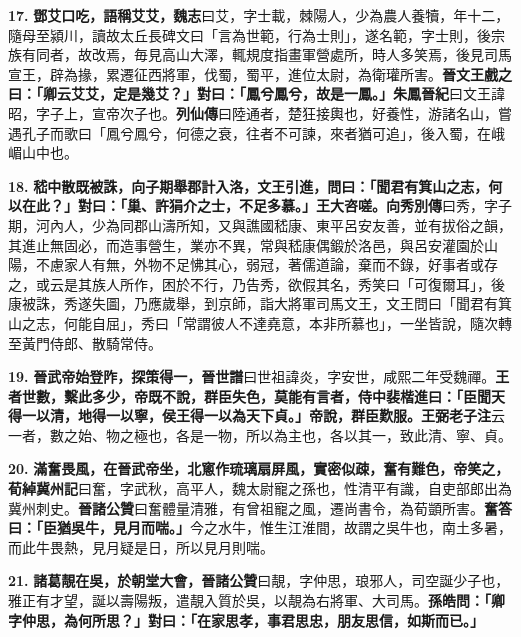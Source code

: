\textbf{17.} \textbf{鄧艾口吃，語稱艾艾，}{\footnotesize \textbf{魏志}曰艾，字士載，棘陽人，少為農人養犢，年十二，隨母至潁川，讀故太丘長碑文曰「言為世範，行為士則」，遂名範，字士則，後宗族有同者，故改焉，毎見高山大澤，輒規度指畫軍營處所，時人多笑焉，後見司馬宣王，辟為掾，累遷征西將軍，伐蜀，蜀平，進位太尉，為衛瓘所害。}\textbf{晉文王戲之曰：「卿云艾艾，定是幾艾？」對曰：「鳳兮鳳兮，故是一鳳。」}{\footnotesize \textbf{朱鳳晉紀}曰文王諱昭，字子上，宣帝次子也。\textbf{列仙傳}曰陸通者，楚狂接輿也，好養性，游諸名山，嘗遇孔子而歌曰「鳳兮鳳兮，何德之衰，往者不可諫，來者猶可追」，後入蜀，在峨嵋山中也。}

\textbf{18.} \textbf{嵇中散既被誅，向子期舉郡計入洛，文王引進，問曰：「聞君有箕山之志，何以在此？」對曰：「巢、許狷介之士，不足多慕。」王大咨嗟。}{\footnotesize \textbf{向秀別傳}曰秀，字子期，河內人，少為同郡山濤所知，又與譙國嵇康、東平呂安友善，並有拔俗之韻，其進止無固必，而造事營生，業亦不異，常與嵇康偶鍛於洛邑，與呂安灌園於山陽，不慮家人有無，外物不足怫其心，弱冠，著儒道論，棄而不錄，好事者或存之，或云是其族人所作，困於不行，乃告秀，欲假其名，秀笑曰「可復爾耳」，後康被誅，秀遂失圖，乃應歲舉，到京師，詣大將軍司馬文王，文王問曰「聞君有箕山之志，何能自屈」，秀曰「常謂彼人不達堯意，本非所慕也」，一坐皆說，隨次轉至黃門侍郎、散騎常侍。}

\textbf{19.} \textbf{晉武帝始登阼，探策得一，}{\footnotesize \textbf{晉世譜}曰世祖諱炎，字安世，咸熙二年受魏禪。}\textbf{王者世數，繫此多少，帝既不說，群臣失色，莫能有言者，侍中裴楷進曰：「臣聞天得一以清，地得一以寧，侯王得一以為天下貞。」帝說，群臣歎服。}{\footnotesize \textbf{王弼老子注}云一者，數之始、物之極也，各是一物，所以為主也，各以其一，致此清、寧、貞。}

\textbf{20.} \textbf{滿奮畏風，在晉武帝坐，北窻作琉璃扇屏風，實密似疎，奮有難色，帝笑之，}{\footnotesize \textbf{荀綽冀州記}曰奮，字武秋，高平人，魏太尉寵之孫也，性清平有識，自吏部郎出為冀州刺史。\textbf{晉諸公贊}曰奮體量清雅，有曾祖寵之風，遷尚書令，為荀顗所害。}\textbf{奮答曰：「臣猶吳牛，見月而喘。」}{\footnotesize 今之水牛，惟生江淮間，故謂之吳牛也，南土多暑，而此牛畏熱，見月疑是日，所以見月則喘。}

\textbf{21.} \textbf{諸葛靚在吳，於朝堂大會，}{\footnotesize \textbf{晉諸公贊}曰靚，字仲思，琅邪人，司空誕少子也，雅正有才望，誕以壽陽叛，遣靚入質於吳，以靚為右將軍、大司馬。}\textbf{孫皓問：「卿字仲思，為何所思？」對曰：「在家思孝，事君思忠，朋友思信，如斯而已。」}

